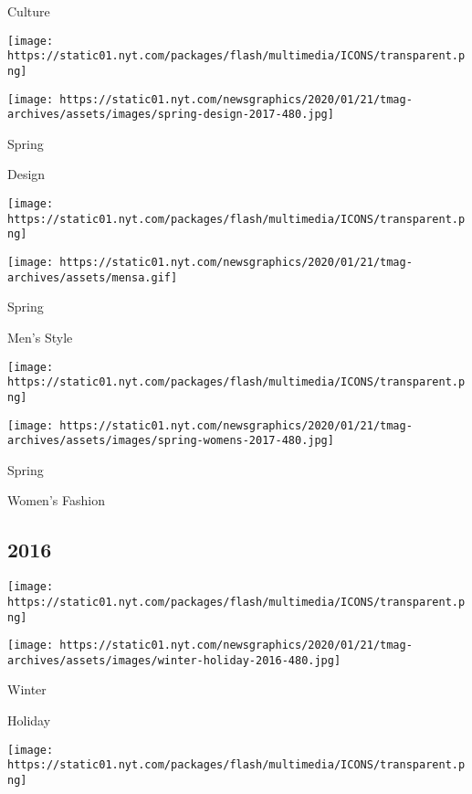 Culture

\href{https://www.nytimes.com/issue/t-magazine/2017/03/07/design-issue-20170326}{}

\texttt{[image: https://static01.nyt.com/packages/flash/multimedia/ICONS/transparent.png]}

\texttt{[image: https://static01.nyt.com/newsgraphics/2020/01/21/tmag-archives/assets/images/spring-design-2017-480.jpg]}

Spring

Design

\href{https://www.nytimes.com/issue/t-magazine/2017/03/05/ts-march-5-mens-style-issue}{}

\texttt{[image: https://static01.nyt.com/packages/flash/multimedia/ICONS/transparent.png]}

\texttt{[image: https://static01.nyt.com/newsgraphics/2020/01/21/tmag-archives/assets/mensa.gif]}

Spring

Men's Style

\href{https://www.nytimes.com/issue/t-magazine/2017/02/19/womens-fashion-issue}{}

\texttt{[image: https://static01.nyt.com/packages/flash/multimedia/ICONS/transparent.png]}

\texttt{[image: https://static01.nyt.com/newsgraphics/2020/01/21/tmag-archives/assets/images/spring-womens-2017-480.jpg]}

Spring

Women's Fashion

\hypertarget{2016}{%
\subsection{2016}\label{2016}}

\href{https://www.nytimes.com/issue/t-magazine/2016/12/04/Ts-Dec-4-Holiday-Issue}{}

\texttt{[image: https://static01.nyt.com/packages/flash/multimedia/ICONS/transparent.png]}

\texttt{[image: https://static01.nyt.com/newsgraphics/2020/01/21/tmag-archives/assets/images/winter-holiday-2016-480.jpg]}

Winter

Holiday

\href{https://www.nytimes.com/issue/t-magazine/2016/11/13/Ts-Nov-13-Travel-Issue}{}

\texttt{[image: https://static01.nyt.com/packages/flash/multimedia/ICONS/transparent.png]}

